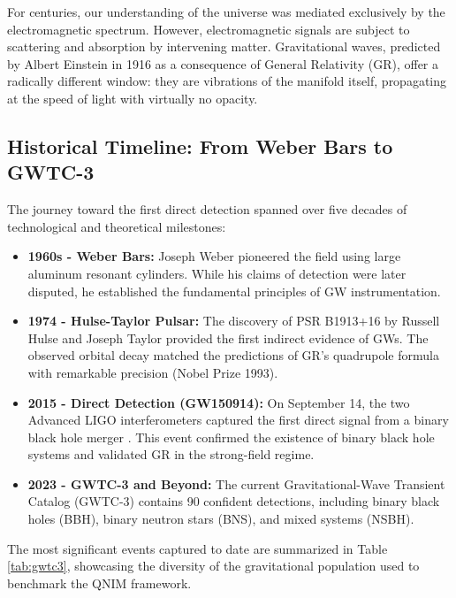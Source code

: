\documentclass[11pt,a4paper,spanish]{book}
\numberwithin{equation}{chapter}
\numberwithin{figure}{chapter}
\numberwithin{equation}{chapter}
\numberwithin{figure}{chapter}
\numberwithin{table}{chapter}
\begin{document}
For centuries, our understanding of the universe was mediated exclusively by the electromagnetic spectrum. However, electromagnetic signals are subject to scattering and absorption by intervening matter. Gravitational waves, predicted by Albert Einstein in 1916 as a consequence of General Relativity (GR), offer a radically different window: they are vibrations of the manifold itself, propagating at the speed of light with virtually no opacity.

\subsection{Historical Timeline: From Weber Bars to GWTC-3}

The journey toward the first direct detection spanned over five decades of technological and theoretical milestones:
\begin{itemize}
    \item \textbf{1960s - Weber Bars:} Joseph Weber pioneered the field using large aluminum resonant cylinders. While his claims of detection were later disputed, he established the fundamental principles of GW instrumentation.
    \item \textbf{1974 - Hulse-Taylor Pulsar:} The discovery of PSR B1913+16 by Russell Hulse and Joseph Taylor provided the first indirect evidence of GWs. The observed orbital decay matched the predictions of GR's quadrupole formula with remarkable precision (Nobel Prize 1993).
    \item \textbf{2015 - Direct Detection (GW150914):} On September 14, the two Advanced LIGO interferometers captured the first direct signal from a binary black hole merger \cite{Abbott_2016}. This event confirmed the existence of binary black hole systems and validated GR in the strong-field regime.
    \item \textbf{2023 - GWTC-3 and Beyond:} The current Gravitational-Wave Transient Catalog (GWTC-3) contains 90 confident detections, including binary black holes (BBH), binary neutron stars (BNS), and mixed systems (NSBH).
\end{itemize}

The most significant events captured to date are summarized in Table \ref{tab:gwtc3}, showcasing the diversity of the gravitational population used to benchmark the QNIM framework.
\end{document}
